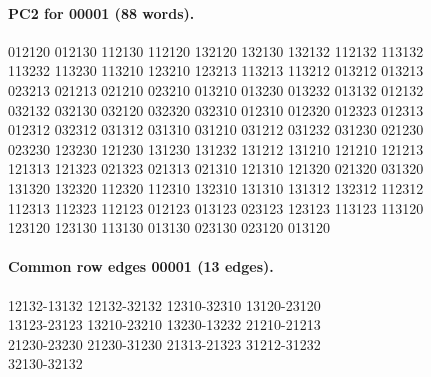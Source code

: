 \paragraph{PC2 for 00001 (88 words).}
\begingroup\footnotesize\ttfamily\begin{flushleft}
012120 012130 112130 112120 132120 132130 132132 112132 113132\\
113232 113230 113210 123210 123213 113213 113212 013212 013213\\
023213 021213 021210 023210 013210 013230 013232 013132 012132\\
032132 032130 032120 032320 032310 012310 012320 012323 012313\\
012312 032312 031312 031310 031210 031212 031232 031230 021230\\
023230 123230 121230 131230 131232 131212 131210 121210 121213\\
121313 121323 021323 021313 021310 121310 121320 021320 031320\\
131320 132320 112320 112310 132310 131310 131312 132312 112312\\
112313 112323 112123 012123 013123 023123 123123 113123 113120\\
123120 123130 113130 013130 023130 023120 013120\\
\end{flushleft}\endgroup
\paragraph{Common row edges 00001 (13 edges).}
\begingroup\footnotesize\ttfamily\begin{flushleft}
12132-13132 12132-32132 12310-32310 13120-23120\\
13123-23123 13210-23210 13230-13232 21210-21213\\
21230-23230 21230-31230 21313-21323 31212-31232\\
32130-32132\\
\end{flushleft}\endgroup

